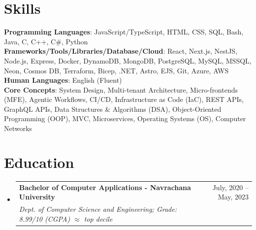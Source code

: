\documentclass[letterpaper,10pt]{article}
\makeatletter
\newcommand{\resumeSubheading}[4]{
  \vspace{0pt}\item
    \begin{tabular*}{0.97\textwidth}[t]{l@{\extracolsep{\fill}}r}
      \textbf{#1} & #2 \\
      \textit{\small#3} & \textit{\small #4} \\
    \end{tabular*}\vspace{-7pt}
}
\newcommand{\resumeSubHeadingListStart}{\begin{itemize}[leftmargin=0.15in, label={}]}
\newcommand{\resumeSubHeadingListEnd}{\end{itemize}}
\makeatother
\begin{document}
\section{Skills}
 \begin{itemize}[leftmargin=0.15in, label={}]
    \small{\item{
     \textbf{Programming Languages}{: JavaScript/TypeScript, HTML, CSS, SQL, Bash, Java, C, C++, C\#, Python } \\
     \textbf{Frameworks/Tools/Libraries/Database/Cloud}{: React, Next.js, NestJS, Node.js, Express, Docker, DynamoDB, MongoDB, PostgreSQL, MySQL, MSSQL, Neon, Cosmos DB, Terraform, Bicep, .NET, Astro, EJS, Git, Azure, AWS} \\
     \textbf{Human Languages}{: English (Fluent)} \\
     \textbf{Core Concepts}{: System Design, Multi-tenant Architecture, Micro-frontends (MFE), Agentic Workflows, CI/CD, Infrastructure as Code (IaC), REST APIs, GraphQL APIs, Data Structures \& Algorithms (DSA), Object-Oriented Programming (OOP), MVC, Microservices, Operating Systems (OS), Computer Networks}
    }}
 \end{itemize}

\section{Education}
  \resumeSubHeadingListStart
    \resumeSubheading
      {Bachelor of Computer Applications - Navrachana University}{July, 2020 -- May, 2023}
      {Dept. of Computer Science and Engineering; Grade: 8.99/10 (CGPA) $\approx$ top decile}{}
  \resumeSubHeadingListEnd

\end{document}
